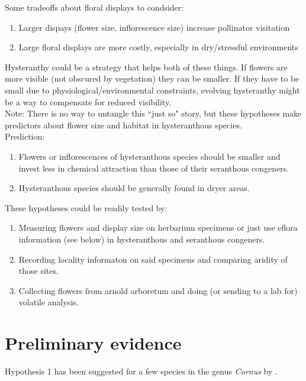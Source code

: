 \documentclass[12pt]{article}
\begin{document}
Some tradeoffs about floral displays to condsider:
\begin{enumerate}
\item Larger dispays (flower size, inflorescence size) increase pollinator visitation \citep{Conner:1996aa,Mitchell:2004aa, Schmid-Hempel:1988aa,Stanton:1988aa, Worley:2000aa}
\item Large floral displays are more costly, especially in dry/stressful environments \citep{Lambrecht:2013aa,Herrera:2009aa,DEBUSSCHE:2004aa}
\end{enumerate}

Hysteranthy could be a strategy that helps both of these things. If flowers are more visible (not obscured by vegetation) they can be smaller. If they have to be small due to physiological/environmental constraints, evolving hysteranthy might be a way to compensate for reduced visibility.\\

Note: There is no way to untangle this ``just so" story, but these hypotheses make predictors about flower size and habitat in hysteranthous species.\\

Prediction:
\begin{enumerate}
\item Flowers or inflorescences of hysteranthous species should be smaller and invest less in chemical attraction than those of their seranthous congeners.
\item Hysteranthous species should be generally found in dryer areas.
\end{enumerate}

These hypotheses could be readily tested by:
\begin{enumerate}
\item Measuring flowers and display size on herbarium specimens or just use eflora information (see below) in hysteranthous and seranthous congeners.
\item Recording locality informaton on said specimens and comparing aridity of those sites. 
\item Collecting flowers from arnold arboretum and doing (or sending to a lab for) volatile analysis.
\end{enumerate}

\section{Preliminary evidence}
Hypothesis 1 has been suggested for a few species in the genus \textit{Cornus} by \citet{Gunatilleke1984}.\\
\end{document}
